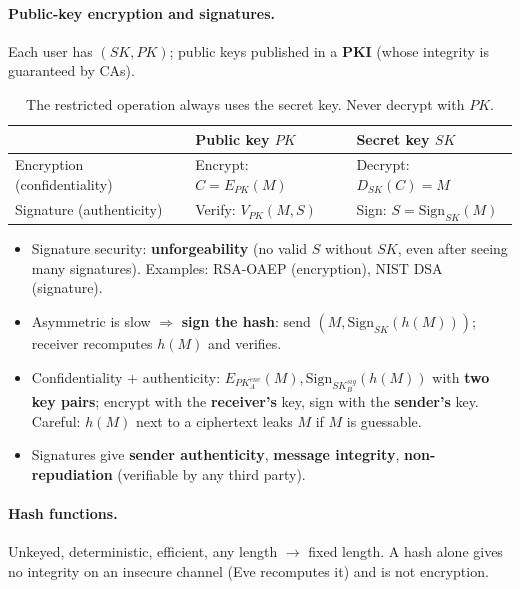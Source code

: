 \paragraph{Public-key encryption and signatures.} Each user has $(SK, PK)$; public keys published in a \textbf{PKI} (whose integrity is guaranteed by CAs).

\begin{table}[h]
\centering
\begin{tabular}{@{}lll@{}}
\toprule
 & \textbf{Public key $PK$} & \textbf{Secret key $SK$} \\
\midrule
Encryption (confidentiality) & Encrypt: $C = E_{PK}(M)$ & Decrypt: $D_{SK}(C) = M$ \\
Signature (authenticity) & Verify: $V_{PK}(M, S)$ & Sign: $S = \mathrm{Sign}_{SK}(M)$ \\
\bottomrule
\end{tabular}
\caption{The restricted operation always uses the secret key. Never decrypt with $PK$.}
\end{table}

\begin{itemize}
    \item Signature security: \textbf{unforgeability} (no valid $S$ without $SK$, even after seeing many signatures). Examples: RSA-OAEP (encryption), NIST DSA (signature).
    \item Asymmetric is slow $\Rightarrow$ \textbf{sign the hash}: send $(M, \mathrm{Sign}_{SK}(h(M)))$; receiver recomputes $h(M)$ and verifies.
    \item Confidentiality + authenticity: $E_{PK_A^{enc}}(M), \mathrm{Sign}_{SK_B^{sig}}(h(M))$ with \textbf{two key pairs}; encrypt with the \textbf{receiver's} key, sign with the \textbf{sender's} key. Careful: $h(M)$ next to a ciphertext leaks $M$ if $M$ is guessable.
    \item Signatures give \textbf{sender authenticity}, \textbf{message integrity}, \textbf{non-repudiation} (verifiable by any third party).
\end{itemize}

\paragraph{Hash functions.} Unkeyed, deterministic, efficient, any length $\to$ fixed length. A hash alone gives no integrity on an insecure channel (Eve recomputes it) and is not encryption.

